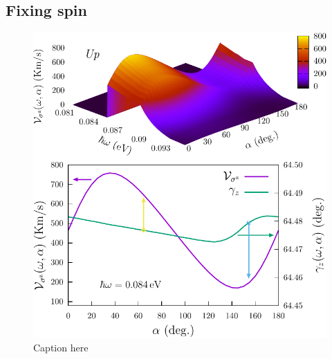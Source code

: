 \documentclass[prb,11pt,tightenlines,twocolumn,aps]{revtex4-1}
\begin{document}


\subsection{Fixing spin} %
\label{sec:res-fixspin}




\begin{figure}[t]
    \centering
    \includegraphics[width=\linewidth]{upplots/up-vsz-w1}
    \caption{Caption here}
    \label{fig:up-vsz-w1}
\end{figure}
\end{document}
